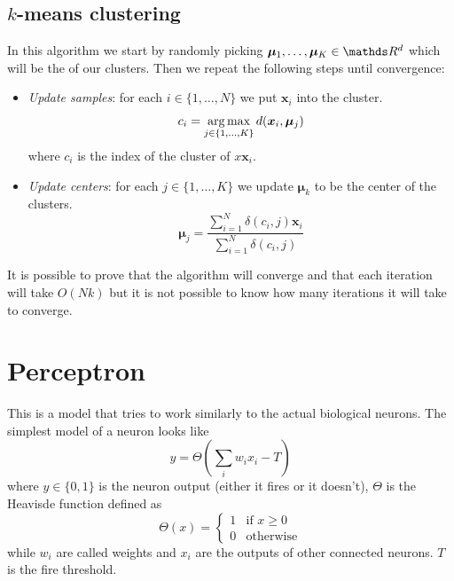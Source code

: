 \documentclass[12pt]{extarticle}
\renewcommand{\vec}[1]{\bm{#1}}
\begin{document}
\subsection{\texorpdfstring{$k$}{k}-means clustering}

In this algorithm we start by randomly picking $\vec \mu_1, \dots, \vec \mu_K \in \R^d$ which will be the
 of our clusters.
Then we repeat the following steps until convergence:
\begin{itemize}
	\item \emph{Update samples}: for each $i \in \{1, \dots, N\}$ we put $\vec x_i$ into the
	       cluster.
	      \begin{equation}
		      c_i = \argmax_{j \in \{1, \dots, K\}} d(\vec x_i, \vec \mu_j)
	      \end{equation}
	      where $c_i$ is the index of the cluster of $x\vec x_i$.

	\item \emph{Update centers}: for each $j \in \{1, \dots, K\}$ we update $\vec \mu_k$ to be the
	      center of the clusters.
	      \begin{equation}
		      \vec \mu_j = \frac{\sum_{i = 1}^N \delta(c_i, j) \vec x_i}{\sum_{i = 1}^N \delta(c_i, j)}
	      \end{equation}
\end{itemize}

It is possible to prove that the algorithm will converge and that each iteration will take $O(Nk)$
but it is not possible to know how many iterations it will take to converge.

\section{Perceptron}

This is a model that tries to work similarly to the actual biological neurons.
The simplest model of a neuron looks like
\begin{equation}
	y = \Theta \left(\sum_i w_i x_i - T \right)
\end{equation}
where $y \in \{0, 1\}$ is the neuron output (either it fires or it doesn't),
$\Theta$ is the Heavisde function defined as
\begin{equation}
	\Theta(x) = \begin{cases}
		1 & \text{if } x \geq 0 \\
		0 & \text{otherwise}
	\end{cases}
\end{equation}
while $w_i$ are called weights and $x_i$ are the outputs of other connected neurons.
$T$ is the fire threshold.
\end{document}

